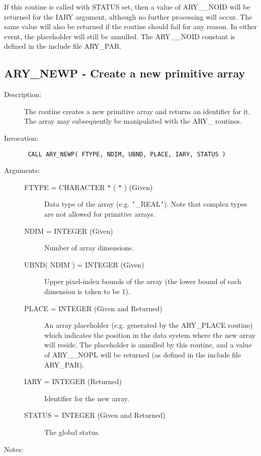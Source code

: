 \documentclass[twoside,11pt]{article}
\newcommand{\xlabel}[1]{}
\newlength{\sstbannerlength}
\newlength{\sstcaptionlength}
\newlength{\sstexampleslength}
\newlength{\sstexampleswidth}
\newcommand{\sstroutine}[3]{
   \goodbreak
   \rule{\textwidth}{0.5mm}
   \vspace{-7ex}
   \newline
   \settowidth{\sstbannerlength}{{\Large {\bf #1}}}
   \setlength{\sstcaptionlength}{\textwidth}
   \setlength{\sstexampleslength}{\textwidth}
   \addtolength{\sstbannerlength}{0.5em}
   \addtolength{\sstcaptionlength}{-2.0\sstbannerlength}
   \addtolength{\sstcaptionlength}{-5.0pt}
   \settowidth{\sstexampleswidth}{{\bf Examples:}}
   \addtolength{\sstexampleslength}{-\sstexampleswidth}
   \parbox[t]{\sstbannerlength}{\flushleft{\Large {\bf #1}}}
   \parbox[t]{\sstcaptionlength}{\center{\Large #2}}
   \parbox[t]{\sstbannerlength}{\flushright{\Large {\bf #1}}}
   \begin{description}
      #3
   \end{description}
}
\newcommand{\sstdescription}[1]{\item[Description:] #1}
\newcommand{\sstinvocation}[1]{\item[Invocation:]\hspace{0.4em}{\tt #1}}
\newcommand{\sstarguments}[1]{
   \item[Arguments:] \mbox{} \\
   \vspace{-3.5ex}
   \begin{description}
      #1
   \end{description}
}
\newcommand{\sstsubsection}[1]{ \item[{#1}] \mbox{} \\}
\newcommand{\sstnotes}[1]{\item[Notes:] \mbox{} \\[1.3ex] #1}
\newcommand{\sstitemlist}[1]{
  \mbox{} \\
  \vspace{-3.5ex}
  \begin{itemize}
     #1
  \end{itemize}
}
\newcommand{\sstitem}{\item}
\newcommand{\ssttt}{\tt}
\renewcommand{\sstroutine}[3]{
      \subsection{#1\xlabel{#1}-\label{#1}#2}
      \begin{description}
         #3
      \end{description}
   }
\renewcommand{\sstdescription}[1]{\item[Description:]
      \begin{description}
         #1
      \end{description}
   }
\renewcommand{\sstinvocation}[1]{\item[Invocation:]
      \begin{description}
         {\ssttt #1}
      \end{description}
   }
\renewcommand{\sstarguments}[1]{
      \item[Arguments:]
      \begin{description}
         #1
      \end{description}
   }
\renewcommand{\sstsubsection}[1]{\item[{#1}]}
\renewcommand{\sstnotes}[1]{\item[Notes:]
      \begin{description}
         #1
      \end{description}
   }
\newcommand{\sstitemlist}[1]{
      \begin{itemize}
         #1
      \end{itemize}
   }
\begin{document}
\begin{eqn*}
{{{         \sstitem
         If this routine is called with STATUS set, then a value of
         ARY\_\_NOID will be returned for the IARY argument, although no
         further processing will occur. The same value will also be
         returned if the routine should fail for any reason. In either
         event, the placeholder will still be annulled. The ARY\_\_NOID
         constant is defined in the include file ARY\_PAR.
      }
   }
}
\sstroutine{
   ARY\_NEWP
}{
   Create a new primitive array
}{
   \sstdescription{
      The routine creates a new primitive array and returns an
      identifier for it. The array may subsequently be manipulated with
      the ARY\_ routines.
   }
   \sstinvocation{
      CALL ARY\_NEWP( FTYPE, NDIM, UBND, PLACE, IARY, STATUS )
   }
   \sstarguments{
      \sstsubsection{
         FTYPE = CHARACTER $*$ ( $*$ ) (Given)
      }{
         Data type of the array (e.g. {\tt '}\_REAL{\tt '}). Note that complex types
         are not allowed for primitive arrays.
      }
      \sstsubsection{
         NDIM = INTEGER (Given)
      }{
         Number of array dimensions.
      }
      \sstsubsection{
         UBND( NDIM ) = INTEGER (Given)
      }{
         Upper pixel-index bounds of the array (the lower bound of each
         dimension is taken to be 1).
      }
      \sstsubsection{
         PLACE = INTEGER (Given and Returned)
      }{
         An array placeholder (e.g. generated by the ARY\_PLACE routine)
         which indicates the position in the data system where the new
         array will reside. The placeholder is annulled by this
         routine, and a value of ARY\_\_NOPL will be returned (as defined
         in the include file ARY\_PAR).
      }
      \sstsubsection{
         IARY = INTEGER (Returned)
      }{
         Identifier for the new array.
      }
      \sstsubsection{
         STATUS = INTEGER (Given and Returned)
      }{
         The global status.
      }
   }
   \sstnotes{
      \sstitemlist{

}}}
\end{eqn*}
\end{document}
